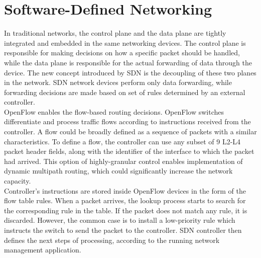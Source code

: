 \documentclass[conference,compsoc]{IEEEtran}
\begin{document}
\section{Software-Defined Networking}
In traditional networks, the control plane and the data plane are tightly integrated and embedded in the same networking devices. The control plane is responsible for making decisions on how a specific packet should be handled, while the data plane is responsible for the actual forwarding of data through the device. The new concept introduced by SDN is the decoupling of these two planes in the network. SDN network devices perform only data forwarding, while forwarding decisions are made based on set of rules determined by an external controller. 
\\ \indent OpenFlow enables the flow-based routing decisions. OpenFlow switches differentiate and process traffic flows according to instructions received from the controller. A flow could be broadly defined as a sequence of packets with a similar characteristics. To define a flow, the controller can use any subset of 9 L2-L4 packet header fields, along with the identifier of the interface to which the packet had arrived. This option of highly-granular control enables implementation of dynamic multipath routing, which could significantly increase the network capacity.
\\ \indent Controller's instructions are stored inside OpenFlow devices in the form of the flow table rules. When a packet arrives, the lookup process starts to search for the corresponding rule in the table. If the packet does not match any rule, it is discarded. However, the common case is to install a low-priority rule which instructs the switch to send the packet to the controller. SDN controller then defines the next steps of processing, according to the running network management application.




%
\IEEEpeerreviewmaketitle





\ifCLASSOPTIONcompsoc
\end{document}
